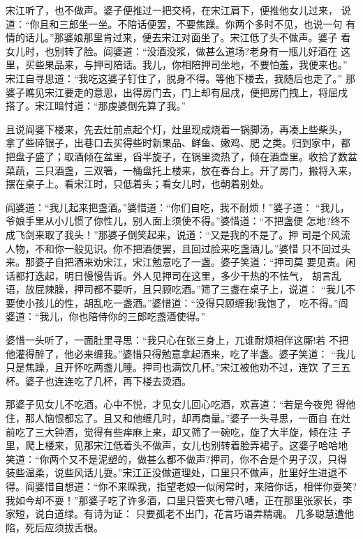 宋江听了，也不做声。婆子便推过一把交椅，在宋江肩下，便推他女儿过来，
说道：“你且和三郎坐一坐。不陪话便罢，不要焦躁。你两个多时不见，也说一句
有情的话儿。”那婆娘那里肯过来，便去宋江对面坐了。宋江低了头不做声。婆子
看女儿时，也别转了脸。阎婆道：“没酒没浆，做甚么道场?老身有一瓶儿好酒在
这里，买些果品来，与押司陪话。我儿，你相陪押司坐地，不要怕羞，我便来也。”
宋江自寻思道：“我吃这婆子钉住了，脱身不得。等他下楼去，我随后也走了。”
那婆子瞧见宋江要走的意思，出得房门去，门上却有屈戌，便把房门拽上，将屈戌
搭了。宋江暗忖道：“那虔婆倒先算了我。”

且说阎婆下楼来，先去灶前点起个灯，灶里现成烧着一锅脚汤，再凑上些柴头，
拿了些碎银子，出巷口去买得些时新果品、鲜鱼、嫩鸡、肥之类。归到家中，都
把盘子盛了；取酒倾在盆里，舀半旋子，在锅里烫热了，倾在酒壶里。收拾了数盆
菜蔬，三只酒盏，三双箸，一桶盘托上楼来，放在春台上。开了房门，搬将入来，
摆在桌子上。看宋江时，只低着头；看女儿时，也朝着别处。

阎婆道：“我儿起来把盏酒。”婆惜道：“你们自吃，我不耐烦！”婆子道：
“我儿，爷娘手里从小儿惯了你性儿，别人面上须使不得。”婆惜道：“不把盏便
怎地?终不成飞剑来取了我头！”那婆子倒笑起来，说道：“又是我的不是了。押
司是个风流人物，不和你一般见识。你不把酒便罢，且回过脸来吃盏酒儿。”婆惜
只不回过头来。那婆子自把酒来劝宋江，宋江勉意吃了一盏。婆子笑道：“押司莫
要见责。闲话都打迭起，明日慢慢告诉。外人见押司在这里，多少干热的不怯气，
胡言乱语，放屁辣臊，押司都不要听，且只顾吃酒。”筛了三盏在桌子上，说道：
“我儿不要使小孩儿的性，胡乱吃一盏酒。”婆惜道：“没得只顾缠我!我饱了，
吃不得。”阎婆道：“我儿，你也陪侍你的三郎吃盏酒使得。”

婆惜一头听了，一面肚里寻思：“我只心在张三身上，兀谁耐烦相伴这厮!若
不把他灌得醉了，他必来缠我。”婆惜只得勉意拿起酒来，吃了半盏。婆子笑道：
“我儿只是焦躁，且开怀吃两盏儿睡。押司也满饮几杯。”宋江被他劝不过，连饮
了三五杯。婆子也连连吃了几杯，再下楼去烫酒。

那婆子见女儿不吃酒，心中不悦，才见女儿回心吃酒，欢喜道：“若是今夜兜
得他住，那人恼恨都忘了。且又和他缠几时，却再商量。”婆子一头寻思，一面自
在灶前吃了三大钟酒，觉得有些痒麻上来，却又筛了一碗吃，旋了大半旋，倾在注
子里，爬上楼来，见那宋江低着头不做声，女儿也别转着脸弄裙子。这婆子哈哈地
笑道：“你两个又不是泥塑的，做甚么都不做声?押司，你不合是个男子汉，只得
装些温柔，说些风话儿耍。”宋江正没做道理处，口里只不做声，肚里好生进退不
得。阎婆惜自想道：“你不来睬我，指望老娘一似闲常时，来陪你话，相伴你耍笑?
我如今却不耍！”那婆子吃了许多酒，口里只管夹七带八嘈，正在那里张家长，李
家短，说白道绿。有诗为证：
只要孤老不出门，花言巧语弄精魂。
几多聪慧遭他陷，死后应须拔舌根。

